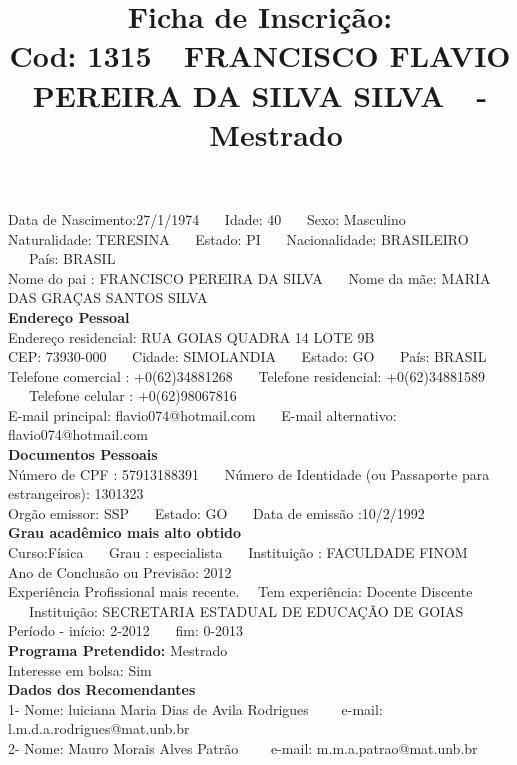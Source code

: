 \documentclass[11pt]{article}
\title{\vspace*{-4cm} Ficha de Inscrição: \\Cod: 1315\ \ FRANCISCO FLAVIO PEREIRA DA SILVA SILVA\ \ - \ \ Mestrado 
 }
\date{}
\begin{document}
\maketitle
\vspace*{-1.5cm}
\noindent Data de Nascimento:27/1/1974
\ \ \ Idade: 40   \ \ \ Sexo: Masculino
\\
Naturalidade: TERESINA  
\ \ \  Estado: PI
\ \ \  Nacionalidade: BRASILEIRO
\ \ \ País: BRASIL
\\        
Nome do pai : FRANCISCO PEREIRA DA SILVA
\ \ \ Nome da mãe: MARIA DAS GRAÇAS SANTOS SILVA          
\\[0.2cm]                     
\textbf{Endereço Pessoal} 
\\ 
\noindent Endereço residencial: RUA GOIAS QUADRA 14 LOTE 9B 
\\
        CEP:  73930-000 
\ \ \ Cidade: SIMOLANDIA 
\ \ \ Estado: GO 
\ \ \ País: BRASIL
\\		
		Telefone comercial : +0(62)34881268
\ \ \ Telefone residencial: +0(62)34881589
\ \ \ Telefone celular : +0(62)98067816
\\
E-mail principal: flavio074@hotmail.com
\ \ \ E-mail alternativo: flavio074@hotmail.com 
\\[0.2cm] 
\textbf{Documentos Pessoais}
\\
\noindent Número de CPF : 57913188391
\ \ \ Número de Identidade (ou Passaporte para estrangeiros): 1301323
\\
Orgão emissor: SSP
\ \ \ Estado: GO
\ \ \ Data de emissão :10/2/1992
\\[0.3cm]
\textbf{Grau acadêmico mais alto obtido}
\\	
Curso:Física
\ \ \ Grau : especialista
\ \ \ Instituição : FACULDADE FINOM
\\			
Ano de Conclusão ou Previsão: 2012
\\ 
Experiência Profissional mais recente. \ \  
Tem experiência: Docente Discente  
\ \ \ Instituição: SECRETARIA ESTADUAL DE EDUCAÇÃO DE GOIAS
\\  
Período - início: 2-2012
\ \ \ fim: 0-2013
\\[0.2cm] 
\textbf{Programa Pretendido:} Mestrado\\
Interesse em bolsa: Sim
\\[0.3cm]		
\textbf{Dados dos Recomendantes} 
\\
1- Nome: luiciana Maria Dias de Avila Rodrigues
\ \ \ \  e-mail: l.m.d.a.rodrigues@mat.unb.br 
\\
2- Nome: Mauro Morais Alves Patrão
\ \ \ \ e-mail: m.m.a.patrao@mat.unb.br
\end{document}
